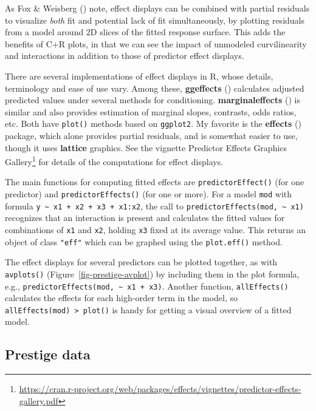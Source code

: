 \documentclass[
  letterpaper,
  10pt,
  krantz2]{krantz}
\providecommand{\href}[2]{#2\footnote{\url{#1}}}
\begin{document}
As Fox \& Weisberg () note, effect
displays can be combined with partial residuals to visualize \emph{both}
fit and potential lack of fit simultaneously, by plotting residuals from
a model around 2D slices of the fitted response surface. This adds the
benefits of C+R plots, in that we can see the impact of unmodeled
curvilinearity and interactions in addition to those of predictor effect
displays.

There are several implementations of effect displays in R, whose
details, terminology and ease of use vary. Among these,
\textbf{ggeffects} ()
calculates adjusted predicted values under several methods for
conditioning. \textbf{marginaleffects}
() is similar and
also provides estimation of marginal slopes, contrasts, odds ratios,
etc. Both have \texttt{plot()} methods based on \texttt{ggplot2}. My
favorite is the \textbf{effects} () package, which alone provides partial residuals, and is somewhat
easier to use, though it uses \textbf{lattice} graphics. See the
vignette
\href{https://cran.r-project.org/web/packages/effects/vignettes/predictor-effects-gallery.pdf}{Predictor
Effects Graphics Gallery} for details of the computations for effect
displays.

The main functions for computing fitted effects are
\texttt{predictorEffect()} (for one predictor) and
\texttt{predictorEffects()} (for one or more). For a model \texttt{mod}
with formula \texttt{y\ \textasciitilde{}\ x1\ +\ x2\ +\ x3\ +\ x1:x2},
the call to \texttt{predictorEffects(mod,\ \textasciitilde{}\ x1)}
recognizes that an interaction is present and calculates the fitted
values for combinations of \texttt{x1} and \texttt{x2}, holding
\texttt{x3} fixed at its average value. This returns an object of class
\texttt{"eff"} which can be graphed using the \texttt{plot.eff()}
method.

The effect displays for several predictors can be plotted together, as
with \texttt{avplots()} (Figure~\ref{fig-prestige-avplot}) by including
them in the plot formula, e.g.,
\texttt{predictorEffects(mod,\ \textasciitilde{}\ x1\ +\ x3)}. Another
function, \texttt{allEffects()} calculates the effects for each
high-order term in the model, so
\texttt{allEffects(mod)\ \textbar{}\textgreater{}\ plot()} is handy for
getting a visual overview of a fitted model.

\subsection{Prestige data}\label{prestige-data-1}
\end{document}
